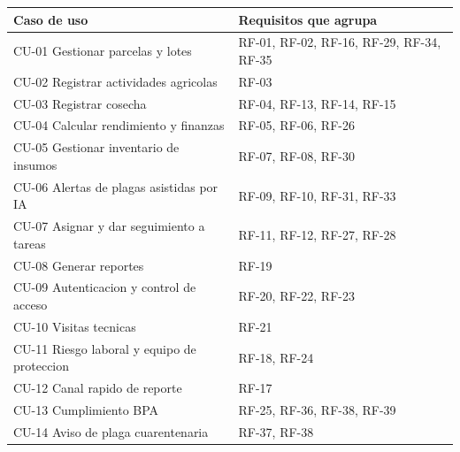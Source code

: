 \documentclass[11pt,a4paper]{article}
\begin{document}
\begin{longtable}{L{6cm} L{9cm}}
\toprule
\textbf{Caso de uso} & \textbf{Requisitos que agrupa} \\
\midrule
\endhead
CU-01 Gestionar parcelas y lotes & RF-01, RF-02, RF-16, RF-29, RF-34, RF-35 \\
CU-02 Registrar actividades agricolas & RF-03 \\
CU-03 Registrar cosecha & RF-04, RF-13, RF-14, RF-15 \\
CU-04 Calcular rendimiento y finanzas & RF-05, RF-06, RF-26 \\
CU-05 Gestionar inventario de insumos & RF-07, RF-08, RF-30 \\
CU-06 Alertas de plagas asistidas por IA & RF-09, RF-10, RF-31, RF-33 \\
CU-07 Asignar y dar seguimiento a tareas & RF-11, RF-12, RF-27, RF-28 \\
CU-08 Generar reportes & RF-19 \\
CU-09 Autenticacion y control de acceso & RF-20, RF-22, RF-23 \\
CU-10 Visitas tecnicas & RF-21 \\
CU-11 Riesgo laboral y equipo de proteccion & RF-18, RF-24 \\
CU-12 Canal rapido de reporte & RF-17 \\
CU-13 Cumplimiento BPA & RF-25, RF-36, RF-38, RF-39 \\
CU-14 Aviso de plaga cuarentenaria & RF-37, RF-38 \\
\bottomrule
\end{longtable}
\end{document}
